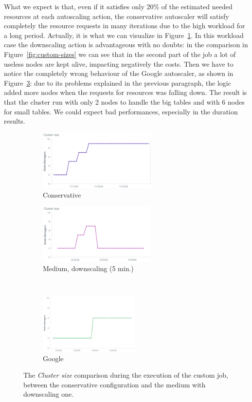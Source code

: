 \documentclass[12pt,twoside,cucitura]{toptesi}
\begin{document}
What we expect is that, even if it satisfies only 20\% of the estimated needed resources at each autoscaling action, the conservative autoscaler will satisfy completely the resource requests in many iterations due to the high workload for a long period. Actually, it is what we can visualize in Figure~\ref{fig:custom-size}. In this workload case the downscaling action is advantageous with no doubts: in the comparison in Figure~\ref{fig:custom-sizes} we can see that in the second part of the job a lot of useless nodes are kept alive, impacting negatively the costs. Then we have to notice the completely wrong behaviour of the Google autoscaler, as shown in Figure~\ref{fig:custom-google-size}: due to its problems explained in the previous paragraph, the logic added more nodes when the requests for resources was falling down. The result is that the cluster run with only 2 nodes to handle the big tables and with 6 nodes for small tables. We could expect bad performances, especially in the duration results. 

\begin{figure}
\begin{subfigure}{.5\linewidth}
\centering
\includegraphics[height=30mm]{custom-size}
\caption{Conservative}\label{fig:custom-size}
\end{subfigure}%
\begin{subfigure}{.5\linewidth}
\centering
\includegraphics[height=30mm]{custom-down-size}
\caption{Medium, downscaling (5 min.)}\label{fig:custom-down-size}
\end{subfigure}\\[1ex]
\begin{subfigure}{\linewidth}
\centering
\includegraphics[height=30mm]{custom-google-size}
\caption{Google}\label{fig:custom-google-size}
\end{subfigure}
\caption{The \textit{Cluster size} comparison during the execution of the custom job, between the conservative configuration and the medium with downscaling one.}\label{fig:custom-sizes}
\label{fig:test}
\end{figure}
\end{document}
